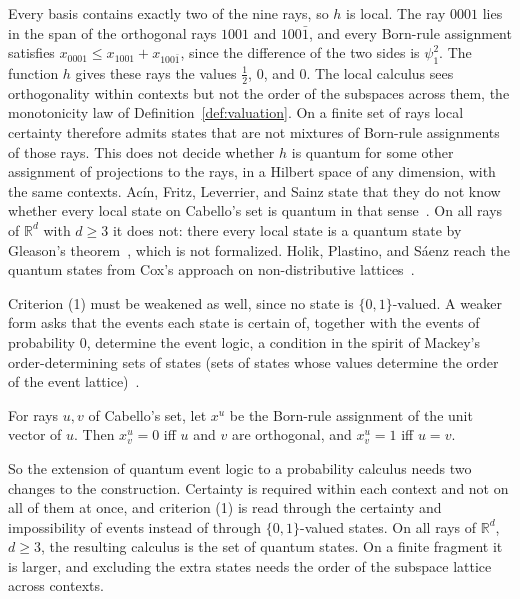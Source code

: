 \noindent
Every basis contains exactly two of the nine rays, so $h$ is local. The
ray $0001$ lies in the span of the orthogonal rays $1001$ and
$100\bar{1}$, and every Born-rule assignment satisfies
$x_{0001} \le x_{1001} + x_{100\bar{1}}$, since the difference of the two
sides is $\psi_1^2$. The function $h$ gives these rays the values
$\tfrac12$, $0$, and $0$. The local calculus sees orthogonality within
contexts but not the order of the subspaces across them, the
monotonicity law of Definition~\ref{def:valuation}. On a finite set of
rays local certainty therefore admits states that are not mixtures of
Born-rule assignments of those rays. This does not decide whether $h$ is
quantum for some other assignment of projections to the rays, in a Hilbert
space of any dimension, with the same contexts. Ac\'in, Fritz, Leverrier,
and Sainz state that they do not know whether every local state on
Cabello's set is quantum in that sense~\cite{acin2015}. On
all rays of $\mathbb{R}^d$ with $d \ge 3$ it does not: there every local
state is a quantum state by Gleason's theorem~\cite{gleason1957}, which
is not formalized. Holik, Plastino, and Sáenz reach the quantum states
from Cox's approach on non-distributive lattices~\cite{holik2014}.

Criterion (1) must be weakened as well, since no state is
$\{0,1\}$-valued. A weaker form asks that the events each state is
certain of, together with the events of probability $0$, determine the
event logic, a condition in the spirit of Mackey's order-determining sets
of states (sets of states whose values determine the order of the event
lattice)~\cite{mackey1963}.

\begin{proposition}
\label{prop:born-ray}
For rays $u, v$ of Cabello's set, let $x^u$ be the Born-rule assignment
of the unit vector of $u$. Then $x^u_v = 0$ iff $u$ and $v$ are
orthogonal, and $x^u_v = 1$ iff $u = v$.
\end{proposition}

\noindent
So the extension of quantum event logic to a probability calculus needs
two changes to the construction. Certainty is required within each
context and not on all of them at once, and criterion (1) is read through
the certainty and impossibility of events instead of through
$\{0,1\}$-valued states. On all rays of $\mathbb{R}^d$, $d \ge 3$, the
resulting calculus is the set of quantum states. On a finite fragment it
is larger, and excluding the extra states needs the order of the
subspace lattice across contexts.

